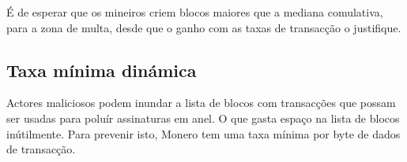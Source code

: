 
É de esperar que os mineiros criem blocos maiores que a mediana comulativa, para a zona de multa, desde que o ganho com as taxas de transacção o justifique.
 


\subsection{Taxa mínima dinámica}
\label{subsec:dynamic-minimum-fee} %

Actores maliciosos podem inundar a lista de blocos com transacções que possam ser usadas para poluír assinaturas em anel. O que gasta espaço na lista de blocos inútilmente.
\newline Para prevenir isto, Monero tem uma taxa mínima por byte de dados de transacção.

